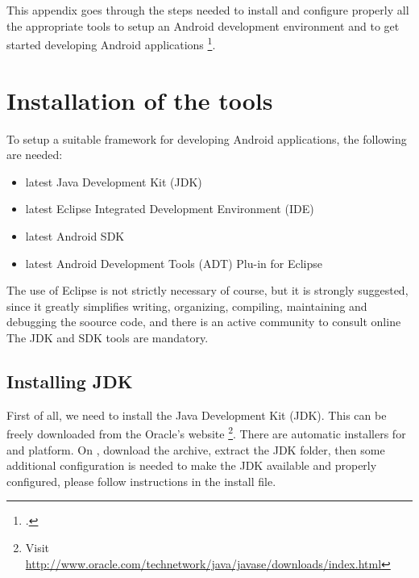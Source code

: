


This appendix goes through the steps needed to install and configure
properly all
the appropriate tools to setup an Android development environment and
to get started developing Android applications%
\footcite[Refer for example to][\S~1 for further
details.]{Mednieks.Dornin.ea:2012}.

\section{Installation of the tools}

To setup a suitable framework for developing Android applications, the following are
needed:
\begin{itemize}
   \item latest Java Development Kit (JDK)
   \item latest Eclipse Integrated Development Environment (IDE)
   \item latest Android SDK
   \item latest Android Development Tools (ADT) Plu-in for Eclipse
\end{itemize}

The use of Eclipse is not strictly necessary of course, but it is strongly
suggested, since it greatly simplifies
writing, organizing, compiling, maintaining and debugging the soource code, and
there is an active community to consult online%
\autocite[Regarding the use of Eclipse for developing Android Apps,
see in particular][]{Cinar:2012}
The JDK and SDK tools are mandatory.

\subsection{Installing JDK\label{sec:JDK}}

First of all, we need to install the Java Development Kit (JDK).
This can be freely downloaded from the Oracle's website%
\footnote{Visit
   \url{http://www.oracle.com/technetwork/java/javase/downloads/index.html}}.
There are automatic installers for \macos{} and \windows{} platform.
On \linux{}, download the archive, extract the JDK folder, then some
additional configuration is needed to make the JDK available and properly
configured, please follow instructions in the install file.


